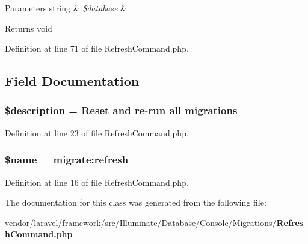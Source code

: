 \begin{DoxyParams}[1]{Parameters}
string & {\em \$database} & \\
\hline
\end{DoxyParams}
\begin{DoxyReturn}{Returns}
void 
\end{DoxyReturn}


Definition at line 71 of file Refresh\+Command.\+php.



\subsection{Field Documentation}
\subsubsection[{\$description}]{\setlength{\rightskip}{0pt plus 5cm}\$description = \textquotesingle{}Reset and re-\/{\bf run} all migrations\textquotesingle{}\hspace{0.3cm}{\ttfamily [protected]}}\label{class_illuminate_1_1_database_1_1_console_1_1_migrations_1_1_refresh_command_a87b032cba06009e3467abf1c8018d960}


Definition at line 23 of file Refresh\+Command.\+php.

\subsubsection[{\$name}]{\setlength{\rightskip}{0pt plus 5cm}\${\bf name} = \textquotesingle{}migrate\+:refresh\textquotesingle{}\hspace{0.3cm}{\ttfamily [protected]}}\label{class_illuminate_1_1_database_1_1_console_1_1_migrations_1_1_refresh_command_ab2fc40d43824ea3e1ce5d86dee0d763b}


Definition at line 16 of file Refresh\+Command.\+php.



The documentation for this class was generated from the following file\+:\begin{DoxyCompactItemize}
\item 
vendor/laravel/framework/src/\+Illuminate/\+Database/\+Console/\+Migrations/{\bf Refresh\+Command.\+php}\end{DoxyCompactItemize}
